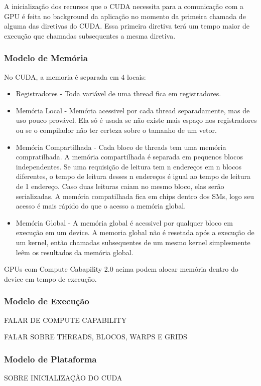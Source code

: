 A inicialização dos recursos que o CUDA necessita para a comunicação com a GPU é feita no background da
aplicação no momento da primeira chamada de alguma das diretivas do CUDA. Essa primeira diretiva terá um
tempo maior de execução que chamadas subsequentes a mesma diretiva.
\subsubsection{Modelo de Memória}
No CUDA, a memoria é separada em 4 locais:
\begin{itemize}
  \item Registradores - Toda variável de uma thread fica em registradores.
  \item Memória Local - Memória acessivel por cada thread separadamente, mas de uso pouco provável. Ela só é usada se
          não existe mais espaço nos registradores ou se o compilador não ter certeza sobre o tamanho de um vetor.
  \item Memória Compartilhada - Cada bloco de threads tem uma memória compratilhada. A memória compartilhada é separada em
          pequenos blocos independentes. Se uma requisição de leitura tem n endereços em n blocos diferentes, o tempo de leitura
          desses n endereços é igual ao tempo de leitura de 1 endereço. Caso duas leituras caiam no mesmo bloco, elas serão
          serializadas. A memória compatilhada fica em chips dentro dos SMs, logo seu acesso é mais rápido do que o acesso a
          memória global.
  \item Memória Global - A memória global é acessivel por qualquer bloco em execução em um device. A memoria global não é
          resetada após a execução de um kernel, então chamadas subsequentes de um mesmo kernel simplesmente leêm os resultados
          da memória global.
\end{itemize}

GPUs com Compute Cabapility 2.0 acima podem alocar memória dentro do device em tempo de execução. 

\subsubsection{Modelo de Execução}
FALAR DE COMPUTE CAPABILITY

FALAR SOBRE THREADS, BLOCOS, WARPS E GRIDS
\subsubsection{Modelo de Plataforma}
SOBRE INICIALIZAÇÃO DO CUDA

